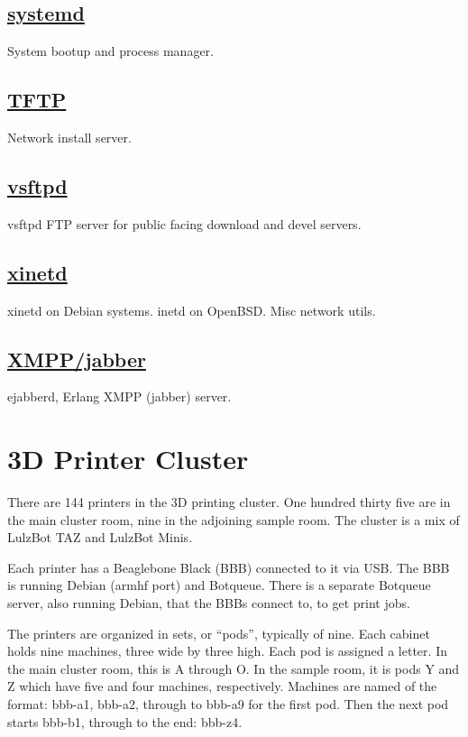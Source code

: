\subsection{\href{http://www.freedesktop.org/wiki/Software/systemd}{systemd}}
System bootup and process manager.

\subsection{\href{http://dnsmasq.org/}{TFTP}}
Network install server.

\subsection{\href{http://vsftpd.beasts.org/}{vsftpd}}
vsftpd FTP server for public facing download and devel servers.

\subsection{\href{http://www.xinetd.org}{xinetd}}
xinetd on Debian systems. inetd on OpenBSD. Misc network utils.

\subsection{\href{http://www.ejabberd.im/}{XMPP/jabber}}
ejabberd, Erlang XMPP (jabber) server.


\section{3D Printer Cluster}
There are 144 printers in the 3D printing cluster. One hundred thirty five are
in the main cluster room, nine in the adjoining sample room. The cluster is a
mix of LulzBot TAZ and LulzBot Minis.

Each printer has a Beaglebone Black (BBB) connected to it via USB. The
BBB is running Debian (armhf port) and Botqueue. There is a separate Botqueue
server, also running Debian, that the BBBs connect to, to get print jobs.

The printers are organized in sets, or ``pods'', typically of nine. Each cabinet
holds nine machines, three wide by three high. Each pod is assigned a letter.
In the main cluster room, this is A through O. In the sample room, it is pods
Y and Z which have five and four machines, respectively. Machines are named
of the format: bbb-a1, bbb-a2, through to bbb-a9 for the first pod. Then the
next pod starts bbb-b1, through to the end: bbb-z4.

